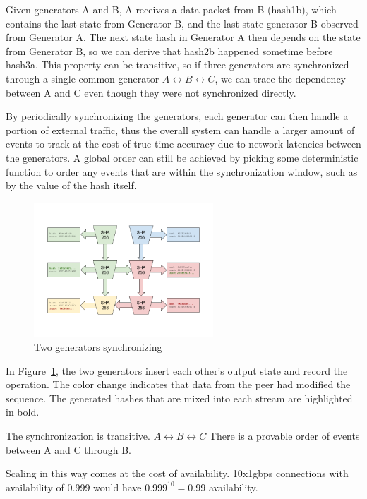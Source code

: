 \documentclass[12pt]{article}
\begin{document}
Given generators A and B, A receives a data packet from B (hash1b), which contains the last state from Generator B, and the last state generator B observed from Generator A. The next state hash in Generator A then depends on the state from Generator B, so we can derive that hash2b happened sometime before hash3a. This property can be transitive, so if three generators are synchronized through a single common generator \(A \leftrightarrow B \leftrightarrow C\), we can trace the dependency between A and C even though they were not synchronized directly.

By periodically synchronizing the generators, each generator can then handle a portion of external traffic, thus the overall system can handle a larger amount of events to track at the cost of true time accuracy due to network latencies between the generators.  A global order can still be achieved by picking some deterministic function to order any events that are within the synchronization window, such as by the value of the hash itself.


\begin{figure}
  \begin{center}
    \centering
    \includegraphics[width=0.6\textwidth]{figures/fig_5.png}
    \caption[Fig 5]{Two generators synchronizing\label{fig:poh_scale}}
  \end{center}
  \end{figure}

In Figure~\ref{fig:poh_scale}, the two generators insert each other’s output state and record the operation.  The color change indicates that data from the peer had modified the sequence.  The generated hashes that are mixed into each stream are highlighted in bold.

The synchronization is transitive. \(A \leftrightarrow B \leftrightarrow C\)  There is a provable order of events between A and C through B.

Scaling in this way comes at the cost of availability.  10x1gbps connections with availability of 0.999 would have \(0.999^{10} = 0.99 \) availability.
\end{document}
